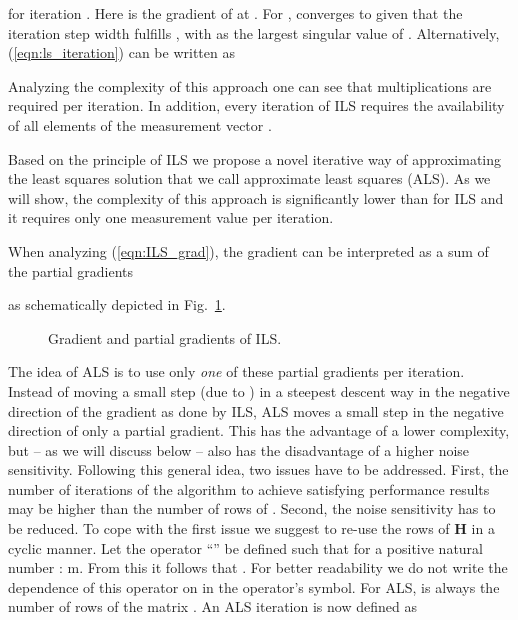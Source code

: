 \documentclass{article}
\begin{document}
for iteration . Here  
is the gradient of  at .
For ,  converges to  given that
the iteration step width  fulfills  \cite{numeric}, 
with  as the largest singular value of .
Alternatively, (\ref{eqn:ls_iteration}) can be written as

Analyzing the complexity of this approach one can see that  multiplications are required per iteration.
In addition, every iteration of ILS requires the availability of all elements 
of the measurement vector .

Based on the principle of ILS we propose a novel iterative way of 
approximating 
the least squares solution that we call approximate least squares (ALS). 
As we will 
show, the complexity of this approach is significantly 
lower than for ILS and it requires only
one measurement value  per iteration.

When analyzing (\ref{eqn:ILS_grad}), the gradient can be interpreted as a 
sum of the partial gradients 

as schematically depicted in Fig.~\ref{fig:partgrad}.
\begin{figure}[h]
\caption{Gradient and partial gradients of ILS.\label{fig:partgrad}}
\end{figure}
The idea of ALS is to use only \emph{one} of these partial gradients per iteration. 
Instead of moving a small step (due to ) in a steepest descent way in the negative direction of the gradient as done by ILS, 
ALS moves a small step in the negative direction of only a partial
gradient.
This has the advantage
of a lower complexity, but -- as we will discuss below -- also has the disadvantage of a higher noise sensitivity. 
Following this general idea,
two issues have to be addressed. First, the number of iterations 
of the algorithm to achieve satisfying performance results may be higher than the number of rows of . Second, the noise sensitivity has
to be reduced.
To cope with the first issue we suggest to re-use the rows  of {\bf H} in a cyclic manner.
Let the operator ``'' be defined such that
for a positive natural number : m. From this it follows 
that . For better readability we do not
write the dependence of this operator 
on  in the operator's symbol. For ALS,  is always the number of rows of the matrix . 
An ALS iteration is now defined as 
\end{document}
